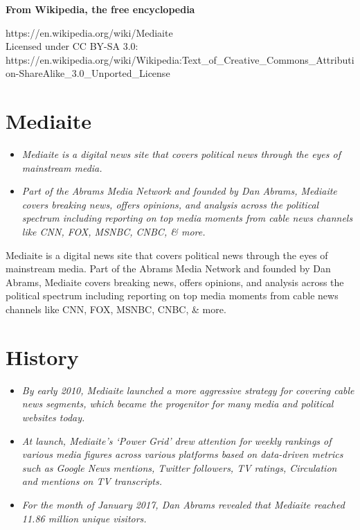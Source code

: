 \textbf{From Wikipedia, the free encyclopedia}

https://en.wikipedia.org/wiki/Mediaite\\
Licensed under CC BY-SA 3.0:\\
https://en.wikipedia.org/wiki/Wikipedia:Text\_of\_Creative\_Commons\_Attribution-ShareAlike\_3.0\_Unported\_License

\section{Mediaite}\label{mediaite}

\begin{itemize}
\item
  \emph{Mediaite is a digital news site that covers political news
  through the eyes of mainstream media.}
\item
  \emph{Part of the Abrams Media Network and founded by Dan Abrams,
  Mediaite covers breaking news, offers opinions, and analysis across
  the political spectrum including reporting on top media moments from
  cable news channels like CNN, FOX, MSNBC, CNBC, \& more.}
\end{itemize}

Mediaite is a digital news site that covers political news through the
eyes of mainstream media. Part of the Abrams Media Network and founded
by Dan Abrams, Mediaite covers breaking news, offers opinions, and
analysis across the political spectrum including reporting on top media
moments from cable news channels like CNN, FOX, MSNBC, CNBC, \& more.

\section{History}\label{history}

\begin{itemize}
\item
  \emph{By early 2010, Mediaite launched a more aggressive strategy for
  covering cable news segments, which became the progenitor for many
  media and political websites today.}
\item
  \emph{At launch, Mediaite's `Power Grid' drew attention for weekly
  rankings of various media figures across various platforms based on
  data-driven metrics such as Google News mentions, Twitter followers,
  TV ratings, Circulation and mentions on TV transcripts.}
\item
  \emph{For the month of January 2017, Dan Abrams revealed that Mediaite
  reached 11.86 million unique visitors.}
\end{itemize}


